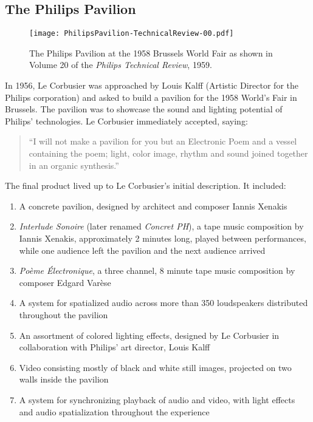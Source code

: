 \subsection{The Philips Pavilion}
\label{sec:philips-pavilion-1}
\begin{figure}[h]
  \texttt{[image: PhilipsPavilion-TechnicalReview-00.pdf]}
  \caption{The Philips Pavilion at the 1958 Brussels World Fair as
    shown in Volume 20 of the \textit{Philips Technical Review}, 1959.}
  \label{fig:philips-pavilion-photo}
\end{figure}
In 1956, Le Corbusier was approached by Louis Kalff (Artistic Director
for the Philips corporation) and asked to build a pavilion for the
1958 World's Fair in Brussels. The pavilion was to showcase the sound
and lighting potential of Philips' technologies. Le Corbusier
immediately accepted, saying:
\begin{quotation}
  ``I will not make a pavilion for you but an Electronic Poem and a
  vessel containing the poem; light, color image, rhythm and sound
  joined together in an organic synthesis.''\cite{Lopez2011} 
\end{quotation}
The final product lived up to Le Corbusier's initial description. It
included:\cite{Lombardo2009}
\begin{enumerate}
\item A concrete pavilion, designed by architect and composer Iannis
  Xenakis
\item \textit{Interlude Sonoire} (later renamed \textit{Concret PH}), a
  tape music composition by Iannis Xenakis, approximately 2 minutes
  long, played between performances, while one audience left the
  pavilion and the next audience arrived
\item \textit{Po\`{e}me \'{E}lectronique}, a three channel, 8 minute
  tape music composition by composer Edgard Var\`{e}se
\item A system for spatialized audio across more than 350 loudspeakers
  distributed throughout the pavilion
\item An assortment of colored lighting effects, designed by Le Corbusier in
  collaboration with Philips' art director, Louis Kalff
\item Video consisting mostly of black and white still images,
  projected on two walls inside the pavilion
\item A system for synchronizing playback of audio and video,
  with light effects and audio spatialization throughout the
  experience
\end{enumerate} 

